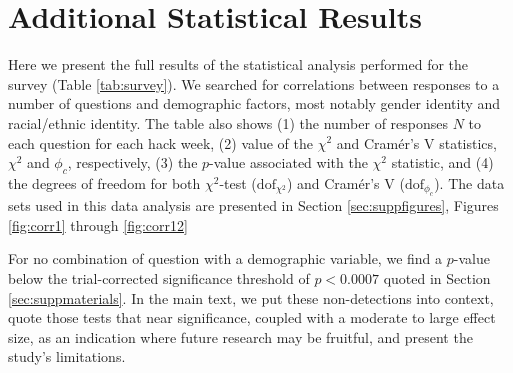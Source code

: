 \documentclass{aastex62}
\begin{document}
\clearpage

\section{Additional Statistical Results}

Here we present the full results of the statistical analysis performed for the survey (Table \ref{tab:survey}). We searched for correlations between responses to a number of questions and demographic factors, most notably gender identity and racial/ethnic identity. The table also shows (1) the number of responses $N$ to each question for each hack week, (2) value of the $\chi^2$ and Cram\'{e}r's V statistics, $\chi^2$ and $\phi_c$, respectively, (3) the $p$-value associated with the $\chi^2$ statistic, and (4) the degrees of freedom for both $\chi^2$-test ($\mathrm{dof}_{\chi^2}$) and Cram\'{e}r's V ($\mathrm{dof}_{\phi_c}$). The data sets used in this data analysis are presented in Section \ref{sec:suppfigures}, Figures \ref{fig:corr1} through \ref{fig:corr12}  

For no combination of question with a demographic variable, we find a $p$-value below the trial-corrected significance threshold of $p < 0.0007$ quoted in Section \ref{sec:suppmaterials}. In the main text, we put these non-detections into context, quote those tests that near significance, coupled with a moderate to large effect size, as an indication where future research may be fruitful, and present the study's limitations.
 
\end{document}
